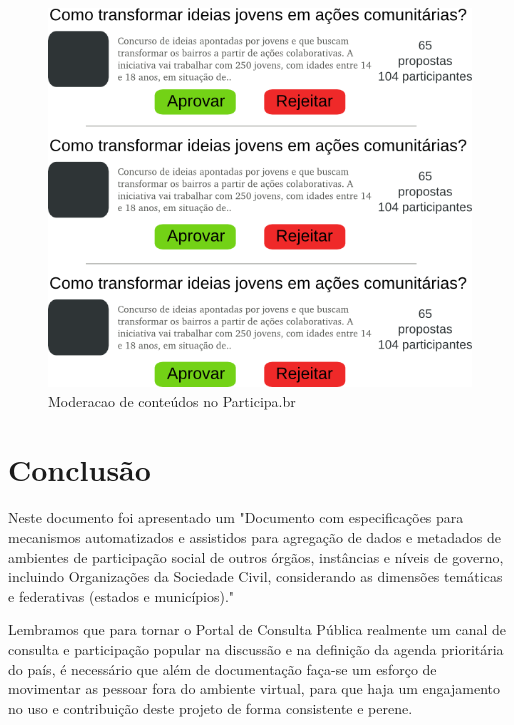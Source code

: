 \documentclass[12pt]{article}
\newcommand{\ProductDescription}{"Documento com especificações para mecanismos
  automatizados e assistidos para agregação de dados e metadados de ambientes
  de participação social de outros órgãos, instâncias e níveis de governo,
  incluindo Organizações da Sociedade Civil, considerando as dimensões
  temáticas e federativas (estados e municípios)."
}
\begin{document}
\begin{figure}[h!]
\center
\includegraphics[scale=0.6]{moderacao.png}
\caption{Moderacao de conteúdos no Participa.br}
\label{moderacao}
\end{figure}

%
%

\section{Conclusão}

Neste documento foi apresentado um \ProductDescription

Lembramos que para tornar o Portal de Consulta Pública realmente um canal de
consulta e participação popular na discussão e na definição da agenda
prioritária do país, é necessário que além de documentação faça-se um esforço
de movimentar as pessoar fora do ambiente virtual, para que haja um
engajamento no uso e contribuição deste projeto de forma consistente e perene.

%

\newpage

\newpage
\listoffigures
\newpage
\printindex
\newpage

\appendix
\appendixpage

\end{document}
